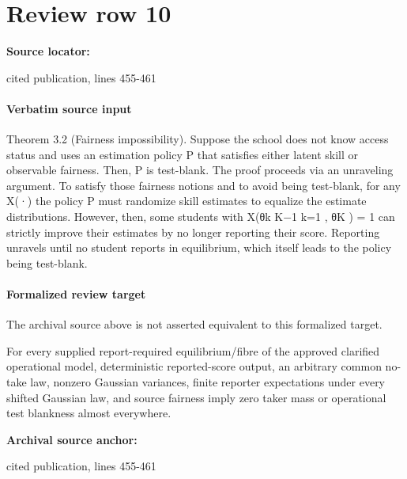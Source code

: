 \documentclass[10pt]{article}
\begin{document}
\section*{Review row 10}
\textbf{Source locator:} {\footnotesize\raggedright cited publication, lines 455-\allowbreak{}461\par}
\paragraph{Verbatim source input}
\begin{ReviewVerbatim}
Theorem 3.2 (Fairness impossibility). Suppose the school does not know access status and uses an
estimation policy P that satisfies either latent skill or observable fairness. Then, P is test-blank.
The proof proceeds via an unraveling argument. To satisfy those fairness notions and to avoid
being test-blank, for any X(·) the policy P must randomize skill estimates to equalize the estimate distributions. However, then, some students with X({θk }K−1
k=1 , θK ) = 1 can strictly improve
their estimates by no longer reporting their score. Reporting unravels until no student reports in
equilibrium, which itself leads to the policy being test-blank.
\end{ReviewVerbatim}


\paragraph{Formalized review target}
The archival source above is not asserted equivalent to this formalized target.
\begin{ReviewVerbatim}
For every supplied report-required equilibrium/fibre of the approved clarified operational model, deterministic reported-score output, an arbitrary common no-take law, nonzero Gaussian variances, finite reporter expectations under every shifted Gaussian law, and source fairness imply zero taker mass or operational test blankness almost everywhere.
\end{ReviewVerbatim}

\textbf{Archival source anchor:} {\footnotesize\raggedright cited publication, lines 455-\allowbreak{}461\par}
\end{document}
